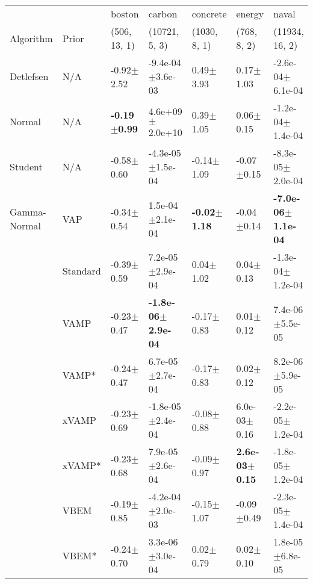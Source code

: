 \begin{tabular}{lllllll}
\toprule
             &       &                   boston &                         carbon &                 concrete &                     energy &                          naval \\
Algorithm & Prior& (506, 13, 1)& (10721, 5, 3)& (1030, 8, 1)& (768, 8, 2)& (11934, 16, 2)\\
\midrule
Detlefsen & N/A &           -0.92$\pm$2.52 &           -9.4e-04$\pm$3.6e-03 &            0.49$\pm$3.93 &              0.17$\pm$1.03 &           -2.6e-04$\pm$6.1e-04 \\
Normal & N/A &  \textbf{-0.19$\pm$0.99} &            4.6e+09$\pm$2.0e+10 &            0.39$\pm$1.05 &              0.06$\pm$0.15 &           -1.2e-04$\pm$1.4e-04 \\
Student & N/A &           -0.58$\pm$0.60 &           -4.3e-05$\pm$1.5e-04 &           -0.14$\pm$1.09 &             -0.07$\pm$0.15 &           -8.3e-05$\pm$2.0e-04 \\
Gamma-Normal & VAP &           -0.34$\pm$0.54 &            1.5e-04$\pm$2.1e-04 &  \textbf{-0.02$\pm$1.18} &             -0.04$\pm$0.14 &  \textbf{-7.0e-06$\pm$1.1e-04} \\
             & Standard &           -0.39$\pm$0.59 &            7.2e-05$\pm$2.9e-04 &            0.04$\pm$1.02 &              0.04$\pm$0.13 &           -1.3e-04$\pm$1.2e-04 \\
             & VAMP &           -0.23$\pm$0.47 &  \textbf{-1.8e-06$\pm$2.9e-04} &           -0.17$\pm$0.83 &              0.01$\pm$0.12 &            7.4e-06$\pm$5.5e-05 \\
             & VAMP* &           -0.24$\pm$0.47 &            6.7e-05$\pm$2.7e-04 &           -0.17$\pm$0.83 &              0.02$\pm$0.12 &            8.2e-06$\pm$5.9e-05 \\
             & xVAMP &           -0.23$\pm$0.69 &           -1.8e-05$\pm$2.4e-04 &           -0.08$\pm$0.88 &           6.0e-03$\pm$0.16 &           -2.2e-05$\pm$1.2e-04 \\
             & xVAMP* &           -0.23$\pm$0.68 &            7.9e-05$\pm$2.6e-04 &           -0.09$\pm$0.97 &  \textbf{2.6e-03$\pm$0.15} &           -1.8e-05$\pm$1.2e-04 \\
             & VBEM &           -0.19$\pm$0.85 &           -4.2e-04$\pm$2.0e-03 &           -0.15$\pm$1.07 &             -0.09$\pm$0.49 &           -2.3e-05$\pm$1.4e-04 \\
             & VBEM* &           -0.24$\pm$0.70 &            3.3e-06$\pm$3.0e-04 &            0.02$\pm$0.79 &              0.02$\pm$0.10 &            1.8e-05$\pm$6.8e-05 \\

\end{tabular}
